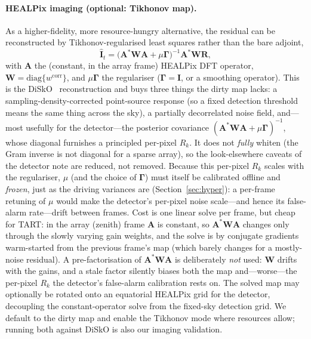 \documentclass[11pt]{article}
\begin{document}
\paragraph{HEALPix imaging (optional: Tikhonov map).} As a higher-fidelity, more resource-hungry
alternative, the residual can be reconstructed by Tikhonov-regularised least squares rather than the
bare adjoint,
\begin{equation}
  \hat{\bm{I}}_t=\big(\bm{A}^{\!*}\bm{W}\bm{A}+\mu\bm{\Gamma}\big)^{-1}\bm{A}^{\!*}\bm{W}\bm{R},
\end{equation}
with $\bm{A}$ the (constant, in the array frame) HEALPix DFT operator, $\bm{W}=\mathrm{diag}\{w^{\mathrm{corr}}\}$,
and $\mu\bm{\Gamma}$ the regulariser ($\bm{\Gamma}=\bm{I}$, or a smoothing operator). This is the
DiSkO~\cite{disko} reconstruction and buys three things the dirty map lacks: a sampling-density-corrected
point-source response (so a fixed detection threshold means the same thing across the sky), a
partially decorrelated noise field, and---most usefully for the detector---the posterior covariance
$(\bm{A}^{\!*}\bm{W}\bm{A}+\mu\bm{\Gamma})^{-1}$, whose diagonal furnishes a principled per-pixel
$R_k$. It does not \emph{fully} whiten (the Gram inverse is not diagonal for a sparse array), so the
look-elsewhere caveats of the detector note are reduced, not removed. Because this per-pixel
$R_k$ scales with the regulariser, $\mu$ (and the choice of $\bm{\Gamma}$) must itself be calibrated
offline and \emph{frozen}, just as the driving variances are (Section~\ref{sec:hyper}): a per-frame
retuning of $\mu$ would make the detector's per-pixel noise scale---and hence its false-alarm
rate---drift between frames. Cost is one linear solve per
frame, but cheap for TART: in the array (zenith) frame $\bm{A}$ is constant, so $\bm{A}^{\!*}\bm{W}\bm{A}$
changes only through the slowly varying gain weights, and the solve is by conjugate gradients
warm-started from the previous frame's map (which barely changes for a mostly-noise residual). A
pre-factorisation of $\bm{A}^{\!*}\bm{W}\bm{A}$ is deliberately \emph{not} used: $\bm{W}$ drifts
with the gains, and a stale factor silently biases both the map and---worse---the per-pixel $R_k$
the detector's false-alarm calibration rests on.
The solved map may optionally be rotated onto an equatorial HEALPix grid for the detector, decoupling
the constant-operator solve from the fixed-sky detection grid. We default to the dirty map and enable
the Tikhonov mode where resources allow; running both against DiSkO is also our imaging validation.
\end{document}
